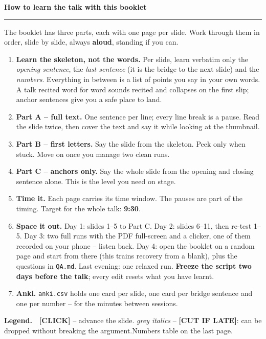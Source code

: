 \documentclass[11pt,a4paper]{article}
\begin{document}
{\color{ctublue}\LARGE\bfseries How to learn the talk with this booklet}

{\color{ctublue}\rule{\textwidth}{1pt}}

\medskip
The booklet has three parts, each with one page per slide. Work through them in order,
slide by slide, always \textbf{aloud}, standing if you can.

\begin{enumerate}[leftmargin=*,itemsep=4pt]
  \item \textbf{Learn the skeleton, not the words.} Per slide, learn verbatim only the
        \emph{opening sentence}, the \emph{last sentence} (it is the bridge to the next
        slide) and the \emph{numbers}. Everything in between is a list of points you say
        in your own words. A talk recited word for word sounds recited and collapses on
        the first slip; anchor sentences give you a safe place to land.
  \item \textbf{Part A -- full text.} One sentence per line; every line break is a pause.
        Read the slide twice, then cover the text and say it while looking at the thumbnail.
  \item \textbf{Part B -- first letters.} Say the slide from the skeleton. Peek only when
        stuck. Move on once you manage two clean runs.
  \item \textbf{Part C -- anchors only.} Say the whole slide from the opening and closing
        sentence alone. This is the level you need on stage.
  \item \textbf{Time it.} Each page carries its time window. The pauses are part of the
        timing. Target for the whole talk: \textbf{9:30}.
  \item \textbf{Space it out.} Day 1: slides 1--5 to Part C. Day 2: slides 6--11, then re-test
        1--5. Day 3: two full runs with the PDF full-screen and a clicker, one of them recorded
        on your phone -- listen back. Day 4: open the booklet on a random page and start
        from there (this trains recovery from a blank), plus the questions in \texttt{QA.md}.
        Last evening: one relaxed run. \textbf{Freeze the script two days before the talk};
        every edit resets what you have learnt.
  \item \textbf{Anki.} \texttt{anki.csv} holds one card per slide, one card per bridge
        sentence and one per number -- for the minutes between sessions.
\end{enumerate}

\medskip
\textbf{Legend.}\ \ {\color{accent}\bfseries [CLICK]} -- advance the slide.\quad
{\color{ink!55}\itshape grey italics} -- \textbf{[CUT IF LATE]}: can be dropped without
breaking the argument.\quad Numbers table on the last page.
\newpage
\end{document}
